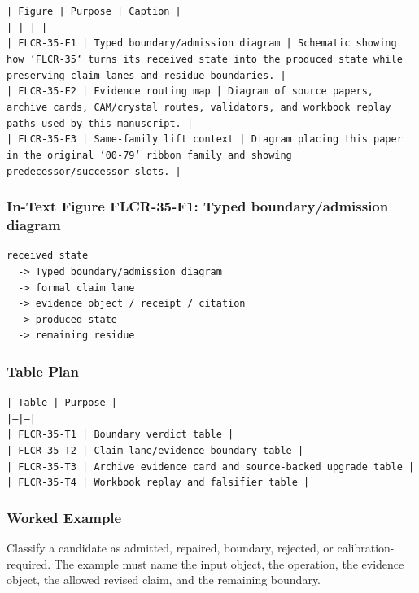 \documentclass[11pt]{article}
\begin{document}
\noindent\texttt{| Figure | Purpose | Caption |}\\
\noindent\texttt{|---|---|---|}\\
\noindent\texttt{| FLCR-35-F1 | Typed boundary/admission diagram | Schematic showing how `FLCR-35` turns its received state into the produced state while preserving claim lanes and residue boundaries. |}\\
\noindent\texttt{| FLCR-35-F2 | Evidence routing map | Diagram of source papers, archive cards, CAM/crystal routes, validators, and workbook replay paths used by this manuscript. |}\\
\noindent\texttt{| FLCR-35-F3 | Same-family lift context | Diagram placing this paper in the original `00-79` ribbon family and showing predecessor/successor slots. |}\\

\subsubsection*{In-Text Figure FLCR-35-F1: Typed boundary/admission diagram}

\begin{verbatim}
received state
  -> Typed boundary/admission diagram
  -> formal claim lane
  -> evidence object / receipt / citation
  -> produced state
  -> remaining residue
\end{verbatim}

\subsubsection*{Table Plan}

\noindent\texttt{| Table | Purpose |}\\
\noindent\texttt{|---|---|}\\
\noindent\texttt{| FLCR-35-T1 | Boundary verdict table |}\\
\noindent\texttt{| FLCR-35-T2 | Claim-lane/evidence-boundary table |}\\
\noindent\texttt{| FLCR-35-T3 | Archive evidence card and source-backed upgrade table |}\\
\noindent\texttt{| FLCR-35-T4 | Workbook replay and falsifier table |}\\

\subsubsection*{Worked Example}

Classify a candidate as admitted, repaired, boundary, rejected, or calibration-required. The example must name the input object, the operation,
the evidence object, the allowed revised claim, and the remaining boundary.
\end{document}
